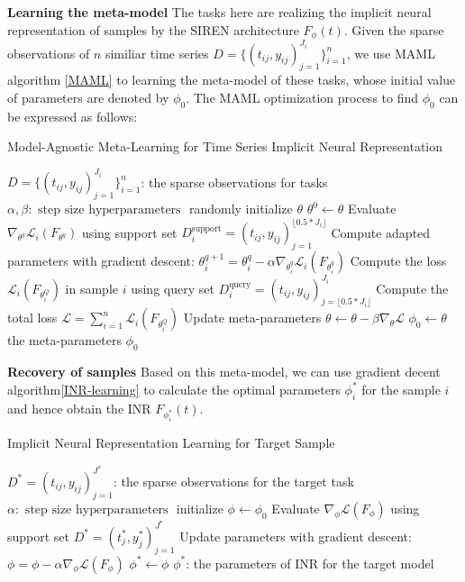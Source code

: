 \documentclass{article}
\begin{document}
\textbf{Learning the meta-model}
The tasks here are realizing the implicit neural representation of samples by the SIREN architecture $F_\phi(t)$.
Given the sparse observations of $n$ similiar time series $D=\{(t_{ij},y_{ij})_{j=1}^{J_i}\}_{i=1}^n$,
we use MAML algorithm \ref{MAML} to learning the meta-model of these tasks, 
whose initial value of parameters are denoted by $\phi_0$. 
The MAML optimization process to find $\phi_0$ can be expressed as follows:
\begin{algorithm}
	\renewcommand{\algorithmicrequire}{\textbf{Input:}}
	\renewcommand{\algorithmicensure}{\textbf{Output:}}
	\caption{Model-Agnostic Meta-Learning for Time Series Implicit Neural Representation}
	\label{MAML}
	\begin{algorithmic}
    \REQUIRE $D=\{(t_{ij},y_{ij})_{j=1}^{J_i}\}_{i=1}^n$: the sparse observations for tasks
    \REQUIRE $\alpha, \beta: \text { step size hyperparameters }$
		\STATE randomly initialize $\theta$
        \STATE $\theta^0 \gets \theta$
          \STATE Evaluate $\nabla_{\theta^q} \mathcal{L}_{i}\left(F_{\theta^q}\right)$ using support set $D_i^{\text{support}}=(t_{ij},y_{ij})_{j=1}^{\lfloor 0.5*J_i\rfloor }$
          \STATE Compute adapted parameters with gradient descent:
          $\theta_i^{q+1}=\theta_i^q-\alpha \nabla_{\theta_i^q} \mathcal{L}_{i}\left(F_{\theta_i^q}\right)$
        \ENDFOR
        \STATE Compute the loss $\mathcal{L}_{i}\left(F_{\theta_i^Q}\right)$ in sample $i$ using query set $D_i^{\text{query}}=(t_{ij},y_{ij})_{j=\lfloor 0.5*J_i\rfloor }^{J_i}$
      \ENDFOR
      \STATE Compute the total loss $\mathcal{L} = \sum_{i=1}^n \mathcal{L}_{i}\left(F_{\theta_i^Q}\right)$
      \STATE Update meta-parameters $\theta \leftarrow \theta-\beta \nabla_\theta \mathcal{L} $
    \ENDWHILE 
    \STATE $\phi_0 \gets \theta$
		\ENSURE the meta-parameters $\phi_0$
  \end{algorithmic}  
\end{algorithm}

\textbf{Recovery of samples}
Based on this meta-model, we can use gradient decent algorithm\ref{INR-learning} to calculate the optimal parameters $\phi^*_i$ for the sample $i$ and hence obtain the INR $F_{\phi^*_i}(t)$. 
\begin{algorithm}
	\renewcommand{\algorithmicrequire}{\textbf{Input:}}
	\renewcommand{\algorithmicensure}{\textbf{Output:}}
	\caption{Implicit Neural Representation Learning for Target Sample}
	\label{INR-learning}
	\begin{algorithmic}
    \REQUIRE $D^*=(t_{ij},y_{ij})_{j=1}^{J^*}$: the sparse observations for the target task
    \REQUIRE $\alpha: \text { step size hyperparameters }$
		\STATE initialize $\phi \gets \phi_0$
      \STATE Evaluate $\nabla_{\phi} \mathcal{L}\left(F_{\phi}\right)$ using support set $D^*=(t_{j}^*,y_{j}^*)_{j=1}^{J^*}$
      \STATE Update parameters with gradient descent:
      $\phi=\phi-\alpha \nabla_{\phi} \mathcal{L}\left(F_{\phi}\right)$
    \ENDWHILE 
    \STATE $\phi^* \gets \phi$
		\ENSURE $\phi^*$: the parameters of INR for the target model 
  \end{algorithmic}  
\end{algorithm}
\end{document}
